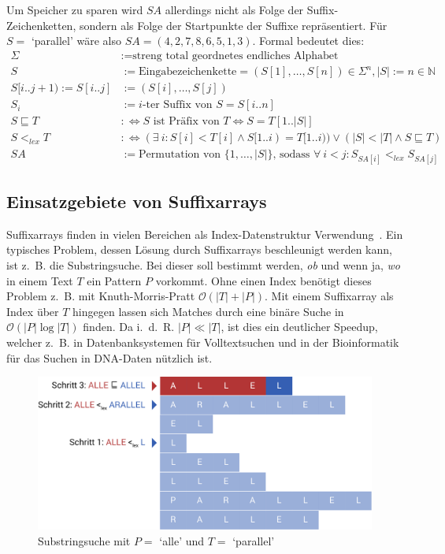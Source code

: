 \documentclass[twoside,a4paper,11pt]{article}
\theoremstyle{break}
\begin{document}
Um Speicher zu sparen wird $SA$ allerdings nicht als Folge der Suffix-Zeichenketten, sondern als Folge der Startpunkte der Suffixe repräsentiert. Für $S =$ `parallel' wäre also $SA = (4, 2, 7, 8, 6, 5, 1, 3)$. Formal bedeutet dies:
\begin{align*}
	\Sigma &:= \text{streng total geordnetes endliches Alphabet} \\
	S &:= \text{Eingabezeichenkette} = (S[1], \dots, S[n]) \in \Sigma^n, |S| := n \in \mathbb{N} \\
	S[i .. j + 1) := S[i .. j] &:= (S[i], \dots, S[j]) \\
	S_i &:= \text{$i$-ter Suffix von $S$} = S[i .. n] \\
	S \sqsubseteq T &:\Leftrightarrow \text{$S$ ist Präfix von $T$} \Leftrightarrow S = T[1 .. |S|] \\
	S <_{lex} T &:\Leftrightarrow (\exists\ i: S[i] < T[i] \land S[1 .. i) = T[1 .. i)) \lor (|S| < |T| \land S \sqsubseteq T) \\
	SA &:= \text{Permutation von } \{1, \dots, |S|\} \text{, sodass } \forall\ i < j: S_{SA[i]} <_{lex} S_{SA[j]}
\end{align*}

\subsection{Einsatzgebiete von Suffixarrays}

Suffixarrays finden in vielen Bereichen als Index-Datenstruktur Verwendung~\cite{wikiSuffixArray}. Ein typisches Problem, dessen Lösung durch Suffixarrays beschleunigt werden kann, ist z.~B. die Substringsuche. Bei dieser soll bestimmt werden, \textit{ob} und wenn ja, \textit{wo} in einem Text $T$ ein Pattern $P$ vorkommt. Ohne einen Index benötigt dieses Problem z.~B. mit Knuth-Morris-Pratt $\mathcal{O}(|T| + |P|)$. Mit einem Suffixarray als Index über $T$ hingegen lassen sich Matches durch eine binäre Suche in $\mathcal{O}(|P| \log |T|)$ finden. Da i.~d.~R. $|P| \ll |T|$, ist dies ein deutlicher Speedup, welcher z.~B. in Datenbanksystemen für Volltextsuchen und in der Bioinformatik für das Suchen in DNA-Daten nützlich ist.

\begin{figure}[h]
	\centering
	\includegraphics[width=0.7\linewidth,bb=0 0 1010 462]{./assets/substringSearch.pdf}
	\caption{Substringsuche mit $P =$ `alle' und $T =$ `parallel'}
\label{fig:substringSearch}
\end{figure}
\end{document}
